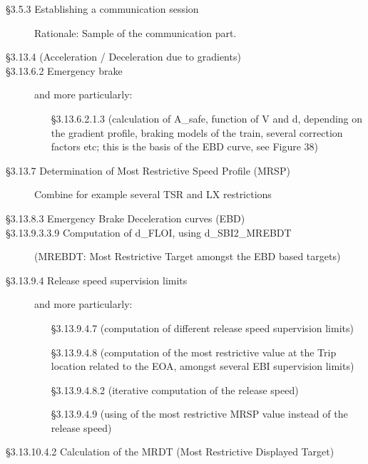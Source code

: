 \documentclass{template/openetcs_article}
\begin{document}
\begin{description}
\item [§3.5.3 Establishing a communication session]

  Rationale: Sample of the communication part.

\item [§3.13.4 (Acceleration / Deceleration due to gradients)]

\item[§3.13.6.2 Emergency brake] and more particularly:
  \begin{itemize}
  \item[§3.13.6.2.1.3] (calculation of A\_safe, function of V and d,
    depending on the gradient profile, braking models of the train,
    several correction factors etc; this is the basis of the EBD
    curve, see Figure 38)
  \end{itemize}

\item[§3.13.7 Determination of Most Restrictive Speed Profile (MRSP)]
  Combine for example several TSR and LX restrictions

\item[§3.13.8.3 Emergency Brake Deceleration curves (EBD)]

\item[§3.13.9.3.3.9 Computation of d\_FLOI, using d\_SBI2\_MREBDT]
  (MREBDT: Most Restrictive Target amongst the EBD based targets)

\item[§3.13.9.4 Release speed supervision limits] and more
  particularly:
  \begin{itemize}
  \item[§3.13.9.4.7] (computation of different release speed
    supervision limits)

  \item[§3.13.9.4.8] (computation of the most restrictive value at the
    Trip location related to the EOA, amongst several EBI supervision
    limits)

    \item[§3.13.9.4.8.2] (iterative computation of the release speed)

    \item[§3.13.9.4.9] (using of the most restrictive MRSP value
      instead of the release speed)
  \end{itemize}

\item[§3.13.10.4.2 Calculation of the MRDT (Most Restrictive Displayed Target)]


\end{description}
\end{document}
